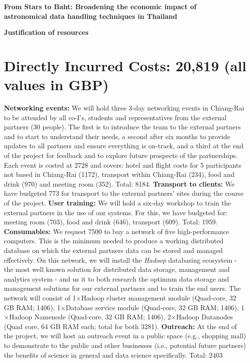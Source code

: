 \documentclass[11pt]{article}
\begin{document}
  \setcounter{figure}{0}
  \noindent
  {\LARGE \bf From Stars to Baht: Broadening the economic impact of \\
  astronomical data handling techniques in Thailand}
  
  \vspace{3mm}
  \noindent
  {\LARGE \bf Justification of resources }
  \vspace{-3mm}
  \section{Directly Incurred Costs: 20,819 (all values in GBP)}
  \vspace{-3mm}
  {\bf Networking events:} We will hold three 3-day networking events in Chiang-Rai to be attended by all co-I's, students and representatives from the external partners (30 people). The first is to introduce the team to the external partners and to start to understand their needs, a second after six months to provide updates to all partners and ensure everything is on-track, and a third at the end of the project for feedback and to explore future prospects of the partnerships. Each event is costed at 2728 and covers: hotel and flight costs for 5 participants not based in Chiang-Rai (1172), transport within Chiang-Rai (234), food and drink (970) and meeting room (352). Total: 8184. {\bf Transport to clients:} We have budgeted 773 for transport to the external partners' sites during the course of the project. {\bf User training:} We will hold a six-day workshop to train the external partners in the use of our systems. For this, we have budgeted for: meeting room (703), food and drink (646), transport (609). Total: 1959. {\bf Consumables:} We request 7500 to buy a network of five high-performance computers. This is the minimum needed to produce a working distributed database on which the external partners data can be stored and managed effectively. On this network, we will install the {\it Hadoop} databasing ecosystem - the most well known solution for distributed data storage, management and analytics system - and us it to both research the optimum data storage and management solutions for our external partners and to train the end users. The network will consist of 1$\times$Hadoop cluster management module (Quad-core, 32 GB RAM; 1406), 1$\times$Database service module (Quad-core, 32 GB RAM; 1406), 1$\times$Hadoop Namenode (Quad-core, 32 GB RAM; 1406), 2$\times$Hadoop Datanodes (Quad core, 64 GB RAM each; total for both 3281). {\bf Outreach:} At the end of the project, we will host an outreach event in a public space (e.g., shopping mall) to demonstrate to the public and other businesses (i.e., potential future partners) the benefits of science in general and data science specifically. Total: 2403
  
\end{document}

